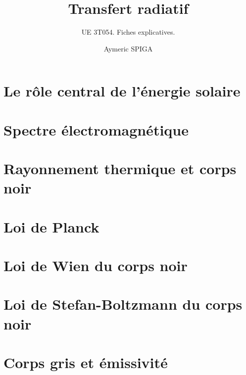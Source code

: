 \documentclass[
	a4paper,
	DIV16,
	10pt]{scrartcl}
\begin{document}
\subject{\texttt{[image: /home/aymeric/Images/Logo/UPMC\_cart-blanc-Q\_7504-703-3.png]}}
\title{Transfert radiatif}
\subtitle{UE 3T054. Fiches explicatives.}
\author{Aymeric SPIGA}
\date{}
\publishers{\small Copie et usage interdits sans autorisation explicite de l'auteur.}

\maketitle


\newpage
\section{Le rôle central de l'énergie solaire}


\newpage
\section{Spectre électromagnétique}


\newpage
\section{Rayonnement thermique et corps noir}



\newpage
\section{Loi de Planck}


\newpage
\section{Loi de Wien du corps noir}


\newpage
\section{Loi de Stefan-Boltzmann du corps noir}


\newpage
\section{Corps gris et émissivité}


\newpage
\end{document}
